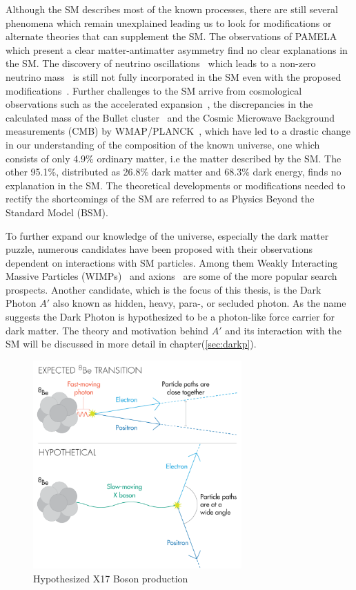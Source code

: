 Although the SM describes most of the known processes, there are still several phenomena which remain unexplained leading us to look for modifications or alternate theories that can supplement the SM. The observations of PAMELA~\cite{Cholis_2009} which present a clear matter-antimatter asymmetry find no clear explanations in the SM. The discovery of neutrino oscillations~\cite{Fukuda_1998} which leads to a non-zero neutrino mass~\cite{Aker:2019uuj} is still not fully incorporated in the SM even with the proposed modifications~\cite{Mohapatra_2007}. Further challenges to the SM arrive from cosmological observations such as the accelerated expansion~\cite{RevModPhys.84.1151}, the discrepancies in the calculated mass of the Bullet cluster~\cite{Clowe_2004} and the Cosmic Microwave Background measurements (CMB) by WMAP/PLANCK~\cite{Bennett_2013,Aghanim:2018eyx}, which have led to a drastic change in our understanding of the composition of the known universe, one which consists of only 4.9\% ordinary matter, i.e the matter described by the SM. The other 95.1\%, distributed as 26.8\% dark matter and 68.3\% dark energy, finds no explanation in the SM. The theoretical developments or modifications needed to rectify the shortcomings of the SM are referred to as Physics Beyond the Standard Model (BSM).

To further expand our knowledge of the universe, especially the dark matter puzzle, numerous candidates have been proposed with their observations dependent on interactions with SM particles. Among them Weakly Interacting Massive Particles (WIMPs)~\cite{Jungman_1996} and axions~\cite{raffelt1995axions} are some of the more popular search prospects. Another candidate, which is the focus of this thesis, is the Dark Photon $A'$ also known as hidden, heavy, para-, or secluded photon. As the name suggests the Dark Photon is hypothesized to be a photon-like force carrier for dark matter. The theory and motivation behind $A'$ and its interaction with the SM will be discussed in more detail in chapter(\ref{sec:darkp}).

\begin{figure}[h!]
\centering
\includegraphics[width=8cm]{thesis_figures/VectorBoson_450.png}
\caption{Hypothesized X17 Boson production~\cite{Quanta_magazine}}
\label{fig:ATOMKI}
\end{figure}

